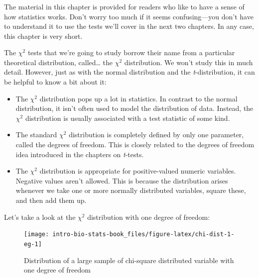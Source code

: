 \documentclass[
]{book}
\providecommand{\tightlist}{%
  \setlength{\itemsep}{0pt}\setlength{\parskip}{0pt}}
\newenvironment{greybox}{
  \definecolor{shadecolor}{rgb}{0.95,0.95,0.95}  %
  \color{black}
  \begin{shaded}}
 {\end{shaded}}
\newenvironment{infobox}[1]
  {
  \begin{itemize}
  \renewcommand{\labelitemi}{
    \raisebox{-.7\height}[0pt][0pt]{
      {\setkeys{Gin}{width=3em,keepaspectratio}
        \texttt{[image: images/\#1]}}
    }
  }
  \setlength{\fboxsep}{1em}
  \begin{greybox}
  \item
  }
  {
  \end{greybox}
  \end{itemize}
  }
\begin{document}
\begin{infobox}{warning}

\hypertarget{section-17}{%
\subsubsection*{}\label{section-17}}

The material in this chapter is provided for readers who like to have a sense of how statistics works. Don't worry too much if it seems confusing---you don't have to understand it to use the tests we'll cover in the next two chapters. In any case, this chapter is very short.

\end{infobox}

The \(\chi^2\) tests that we're going to study borrow their name from a particular theoretical distribution, called\ldots{} the \(\chi^2\) distribution. We won't study this in much detail. However, just as with the normal distribution and the \emph{t}-distribution, it can be helpful to know a bit about it:

\begin{itemize}
\tightlist
\item
  The \(\chi^2\) distribution pops up a lot in statistics. In contrast to the normal distribution, it isn't often used to model the distribution of data. Instead, the \(\chi^2\) distribution is usually associated with a test statistic of some kind.
\item
  The standard \(\chi^2\) distribution is completely defined by only one parameter, called the degrees of freedom. This is closely related to the degrees of freedom idea introduced in the chapters on \emph{t}-tests.
\item
  The \(\chi^2\) distribution is appropriate for positive-valued numeric variables. Negative values aren't allowed. This is because the distribution arises whenever we take one or more normally distributed variables, square these, and then add them up.
\end{itemize}

Let's take a look at the \(\chi^2\) distribution with one degree of freedom:

\begin{figure}

{\centering \texttt{[image: intro-bio-stats-book\_files/figure-latex/chi-dist-1-eg-1]} 

}

\caption{Distribution of a large sample of chi-square distributed variable with one degree of freedom}\label{fig:chi-dist-1-eg}
\end{figure}
\end{document}
